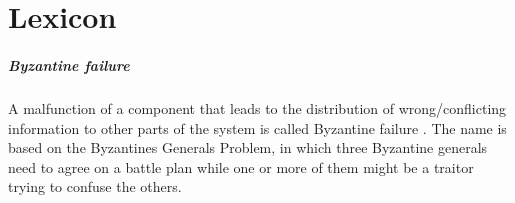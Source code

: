 

\cleardoublepage
\chapter{Lexicon}
\label{app:dic}

\paragraph*{Byzantine failure} A malfunction of a component that leads to the distribution of wrong/conflicting information to other parts of the system is called Byzantine failure \cite{lamport1982byzantine}. The name is based on the Byzantines Generals Problem, in which three Byzantine generals need to agree on a battle plan while one or more of them might be a traitor trying to confuse the others.
